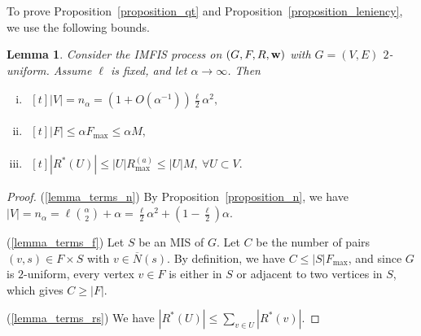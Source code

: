 \documentclass{article}
\theoremstyle{plain}
\theoremstyle{remark}
\theoremstyle{plain}
\newtheorem{lemma}[theorem]{Lemma}
\numberwithin{equation}{section}
\renewcommand{\b}{{\bf{w}}}
\begin{document}
	To prove Proposition~\ref{proposition_qt} and Proposition~\ref{proposition_leniency}, we use the following bounds.
	
	\begin{lemma}\label{lemma_terms}
		Consider the IMFIS process on $(G,F,R,\b)$ with $G=(V,E)$ $2$-uniform. Assume $\ell$ is fixed, and let $\alpha\to\infty$. Then
		\begin{enumerate}[(i)]
			\item\label{lemma_terms_n} $\begin{aligned}[t]
				|V|=n_{\alpha}=(1+O(\alpha^{-1}))\tfrac{\ell}{2}\alpha^2,
			\end{aligned}$
			\item\label{lemma_terms_f} $\begin{aligned}[t]
				|F|\leq\alpha F_{\max}\leq\alpha M,
			\end{aligned}$
			\item\label{lemma_terms_rs} $\begin{aligned}[t]
				|R^*(U)|\leq|U|R_{\max}^{(a)}\leq|U|M,\ \forall U\subset V.
			\end{aligned}$
		\end{enumerate}
	\end{lemma}
	
	\begin{proof}
		(\ref{lemma_terms_n}) By Proposition~\ref{proposition_n}, we have $|V|=n_{\alpha}=\ell\binom{\alpha}{2}+\alpha=\frac{\ell}{2}\alpha^2+(1-\frac{\ell}{2})\alpha$.
		
		(\ref{lemma_terms_f}) Let $S$ be an MIS of $G$. Let $C$ be the number of pairs $(v,s)\in F\times S$ with $v\in\overline{N}(s)$. By definition, we have $C\leq|S|F_{\max}$, and since $G$ is $2$-uniform, every vertex $v\in F$ is either in $S$ or adjacent to two vertices in $S$, which gives $C\geq|F|$.
		
		(\ref{lemma_terms_rs}) We have $|R^*(U)|\leq\sum_{v\in U}|R^*(v)|$.
	\end{proof}
	
\end{document}
